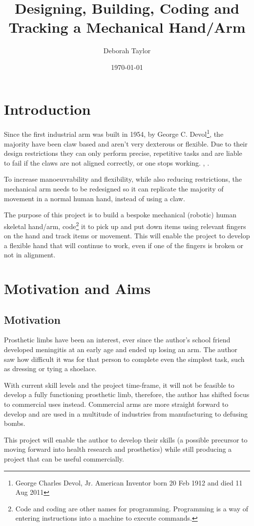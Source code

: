 \documentclass[progress]{cmpreport}
\title{Designing, Building, Coding and Tracking a Mechanical Hand/Arm}
\author{Deborah Taylor}
\date{\today}
\begin{document}
\section{Introduction}
Since the first industrial arm was built in 1954, by George C. Devol\footnote{George Charles Devol, Jr. American Inventor born 20 Feb 1912 and died 11 Aug 2011}, the majority have been claw based and aren't very dexterous or flexible. Due to their design restrictions they can only perform precise, repetitive tasks and are liable to fail if the claws are not aligned correctly, or one stops working. \citep{devol}, \citep{grigorediscovering}.  

To increase manoeuvrability and flexibility, while also reducing restrictions, the mechanical arm needs to be redesigned so it can replicate the majority of movement in a normal human hand, instead of using a claw. 

The purpose of this project is to build a bespoke mechanical (robotic) human skeletal hand/arm, code\footnote{Code and coding are other names for programming. Programming is a way of entering instructions into a machine to execute commands.} it to pick up and put down items using relevant fingers on the hand and track items or movement. This will enable the project to develop a flexible hand that will continue to work, even if one of the fingers is broken or not in alignment. 


\section{Motivation and Aims}
\subsection{Motivation}
 
Prosthetic limbs have been an interest, ever since the author's school friend developed meningitis at an early age and ended up losing an arm. The author saw how difficult it was for that person to complete even the simplest task, such as dressing or tying a shoelace. 

With current skill levels and the project time-frame, it will not be feasible to develop a fully functioning prosthetic limb, therefore, the author has shifted focus to commercial uses instead. Commercial arms are more straight forward to develop and are used in a multitude of industries from manufacturing to defusing bombs. 

This project will enable the author to develop their skills (a possible precursor to moving forward into health research and prosthetics) while still producing a project that can be useful commercially.  
\end{document}
